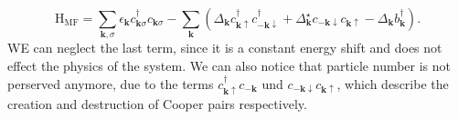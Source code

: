 \begin{equation}
	\mathrm{H}_\text{MF}=\sum_{\mathbf{k},\sigma} \epsilon_{\mathbf{k}} c_{\mathbf{k} \sigma}^\dagger c_{\mathbf{k} \sigma}-\sum_{\mathbf{k}}\left(\Delta_{\mathbf{k}} c_{\mathbf{k} \uparrow}^\dagger c_{-\mathbf{k} \downarrow}^\dagger+\Delta_{\mathbf{k}}^\star c_{-\mathbf{k} \downarrow} c_{\mathbf{k} \uparrow}-\Delta_{\mathbf{k}} b_{\mathbf{k}}^\dagger\right).
	\label{eq:bcs_mean_field}
\end{equation}
WE can neglect the last term, since it is a constant energy shift and does not effect the physics of the system. We can also notice that particle number is not perserved anymore, due to the terms $c_{\mathbf{k} \uparrow}^\dagger c_{-\mathbf{k}}$ und $c_{-\mathbf{k} \downarrow} c_{\mathbf{k} \uparrow}$, which describe the creation and destruction of Cooper pairs respectively. 

